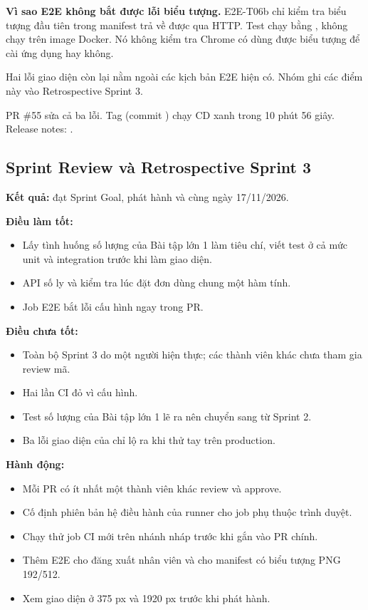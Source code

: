 \textbf{Vì sao E2E không bắt được lỗi biểu tượng.} E2E-T06b chỉ kiểm tra biểu tượng đầu tiên trong manifest trả về được qua HTTP. Test chạy bằng , không chạy trên image Docker. Nó không kiểm tra Chrome có dùng được biểu tượng để cài ứng dụng hay không.

Hai lỗi giao diện còn lại nằm ngoài các kịch bản E2E hiện có. Nhóm ghi các điểm này vào Retrospective Sprint 3.

PR \#55 sửa cả ba lỗi. Tag  (commit ) chạy CD xanh trong 10 phút 56 giây. Release notes: .


\subsection{Sprint Review và Retrospective Sprint 3}
\textbf{Kết quả:} đạt Sprint Goal, phát hành  và  cùng ngày 17/11/2026.

\textbf{Điều làm tốt:}
\begin{itemize}
\item Lấy tình huống số lượng của Bài tập lớn 1 làm tiêu chí, viết test ở cả mức unit và integration trước khi làm giao diện.
\item API số ly và kiểm tra lúc đặt đơn dùng chung một hàm tính.
\item Job E2E bắt lỗi cấu hình ngay trong PR.
\end{itemize}

\textbf{Điều chưa tốt:}
\begin{itemize}
\item Toàn bộ Sprint 3 do một người hiện thực; các thành viên khác chưa tham gia review mã.
\item Hai lần CI đỏ vì cấu hình.
\item Test số lượng của Bài tập lớn 1 lẽ ra nên chuyển sang từ Sprint 2.
\item Ba lỗi giao diện của  chỉ lộ ra khi thử tay trên production.
\end{itemize}

\textbf{Hành động:}
\begin{itemize}
\item Mỗi PR có ít nhất một thành viên khác review và approve.
\item Cố định phiên bản hệ điều hành của runner cho job phụ thuộc trình duyệt.
\item Chạy thử job CI mới trên nhánh nháp trước khi gắn vào PR chính.
\item Thêm E2E cho đăng xuất nhân viên và cho manifest có biểu tượng PNG 192/512.
\item Xem giao diện ở 375 px và 1920 px trước khi phát hành.
\end{itemize}


